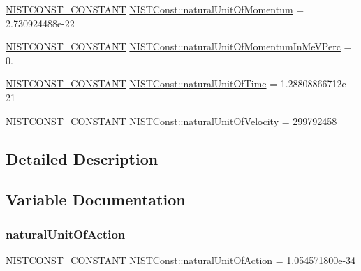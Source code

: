 \begin{DoxyCompactItemize}
\mbox{\hyperlink{_n_i_s_t_const_8hpp_a2b0fc1d7452373f816175dd86ce26729}{N\+I\+S\+T\+C\+O\+N\+S\+T\+\_\+\+C\+O\+N\+S\+T\+A\+NT}} \mbox{\hyperlink{group___n_i_s_t_const-_natural_unit_ga020a191050aee0f8de449b86901efcab}{N\+I\+S\+T\+Const\+::natural\+Unit\+Of\+Momentum}} = 2.\+730924488e-\/22
\item 
\mbox{\hyperlink{_n_i_s_t_const_8hpp_a2b0fc1d7452373f816175dd86ce26729}{N\+I\+S\+T\+C\+O\+N\+S\+T\+\_\+\+C\+O\+N\+S\+T\+A\+NT}} \mbox{\hyperlink{group___n_i_s_t_const-_natural_unit_ga1768d322c0f9342d6fb5a30d1158a6ca}{N\+I\+S\+T\+Const\+::natural\+Unit\+Of\+Momentum\+In\+Me\+V\+Perc}} = 0.
\item 
\mbox{\hyperlink{_n_i_s_t_const_8hpp_a2b0fc1d7452373f816175dd86ce26729}{N\+I\+S\+T\+C\+O\+N\+S\+T\+\_\+\+C\+O\+N\+S\+T\+A\+NT}} \mbox{\hyperlink{group___n_i_s_t_const-_natural_unit_gab65c3f69b157abb96800734bdc63f25d}{N\+I\+S\+T\+Const\+::natural\+Unit\+Of\+Time}} = 1.\+28808866712e-\/21
\item 
\mbox{\hyperlink{_n_i_s_t_const_8hpp_a2b0fc1d7452373f816175dd86ce26729}{N\+I\+S\+T\+C\+O\+N\+S\+T\+\_\+\+C\+O\+N\+S\+T\+A\+NT}} \mbox{\hyperlink{group___n_i_s_t_const-_natural_unit_ga89a69b160a137580df146f4407c5290b}{N\+I\+S\+T\+Const\+::natural\+Unit\+Of\+Velocity}} = 299792458
\end{DoxyCompactItemize}


\subsection{Detailed Description}


\subsection{Variable Documentation}
\mbox{\label{group___n_i_s_t_const-_natural_unit_ga52ce10be6f28a0403e43f42445dd5bdb}} 
\subsubsection{\texorpdfstring{natural\+Unit\+Of\+Action}{naturalUnitOfAction}}
{\footnotesize\ttfamily \mbox{\hyperlink{_n_i_s_t_const_8hpp_a2b0fc1d7452373f816175dd86ce26729}{N\+I\+S\+T\+C\+O\+N\+S\+T\+\_\+\+C\+O\+N\+S\+T\+A\+NT}} N\+I\+S\+T\+Const\+::natural\+Unit\+Of\+Action = 1.\+054571800e-\/34}

